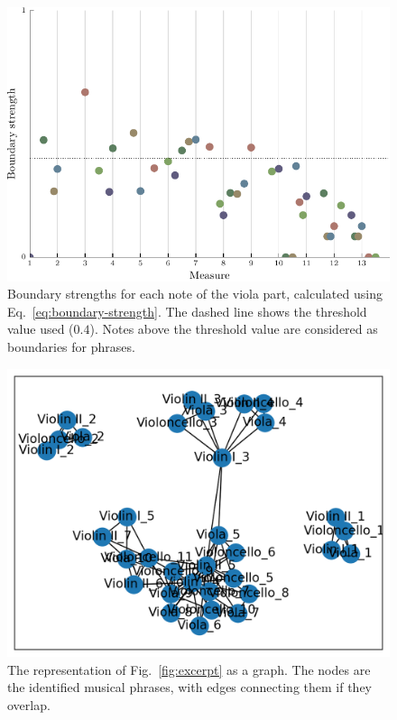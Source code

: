\documentclass[aps,pra,10pt,twocolumn]{revtex4-2}
\begin{document}
\begin{figure}[h]
    \centering
    \includegraphics[width=\linewidth]{../Figures/boundary_offset.pdf}
    \caption{Boundary strengths for each note of the viola part, calculated using Eq.\ \ref{eq:boundary-strength}. The dashed line shows the threshold value used ($0.4$). Notes above the threshold value are considered as boundaries for phrases.}
    \label{fig:boundary-strengths}
\end{figure}

\begin{figure}[h]
    \centering
    \includegraphics[width=\linewidth]{../Trials/1_graph.png}
    \caption{The representation of Fig.\ \ref{fig:excerpt} as a graph. The nodes are the identified musical phrases, with edges connecting them if they overlap.}
    \label{fig:graph}
\end{figure}
\end{document}
